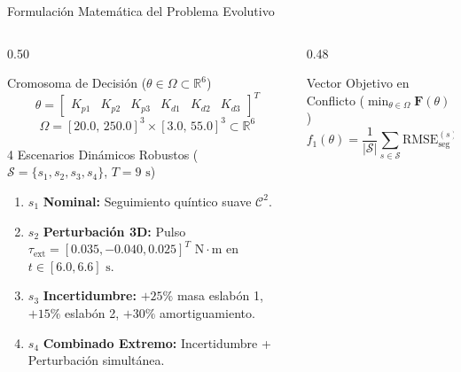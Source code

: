 \documentclass[aspectratio=169,9pt]{beamer}
\begin{document}
\begin{frame}{Formulación Matemática del Problema Evolutivo}
\vspace{-0.18cm}
\begin{columns}[T,onlytextwidth]
\begin{column}{0.50\textwidth}
    \begin{block}{\footnotesize Cromosoma de Decisión ($\theta \in \Omega \subset \mathbb{R}^6$)}
        \scriptsize
        \vspace{-0.18cm}
        \[
            \theta = \begin{bmatrix} K_{p1} & K_{p2} & K_{p3} & K_{d1} & K_{d2} & K_{d3} \end{bmatrix}^T
        \]
        \vspace{-0.22cm}
        \[
            \Omega = [20.0,\, 250.0]^3 \times [3.0,\, 55.0]^3 \subset \mathbb{R}^6
        \]
        \vspace{-0.2cm}
    \end{block}
    \vspace{-0.12cm}
    \begin{exampleblock}{\footnotesize 4 Escenarios Dinámicos Robustos ($\mathcal{S} = \{s_1,s_2,s_3,s_4\}$, $T=9\text{ s}$)}
        \scriptsize
        \begin{enumerate}\setlength{\itemsep}{1pt}
            \item $s_1$ \textbf{Nominal:} Seguimiento quíntico suave $\mathcal{C}^2$.
            \item $s_2$ \textbf{Perturbación 3D:} Pulso $\tau_{\text{ext}} = [0.035, -0.040, 0.025]^T\text{ N}\cdot\text{m}$ en $t \in [6.0, 6.6]\text{ s}$.
            \item $s_3$ \textbf{Incertidumbre:} $+25\%$ masa eslabón 1, $+15\%$ eslabón 2, $+30\%$ amortiguamiento.
            \item $s_4$ \textbf{Combinado Extremo:} Incertidumbre + Perturbación simultánea.
        \end{enumerate}
    \end{exampleblock}
\end{column}
\begin{column}{0.48\textwidth}
    \begin{block}{\footnotesize Vector Objetivo en Conflicto ($\min_{\theta \in \Omega} \mathbf{F}(\theta)$)}
        \scriptsize
        \vspace{-0.15cm}
        \[
            f_1(\theta) = \frac{1}{|\mathcal{S}|}\sum_{s \in \mathcal{S}} \text{RMSE}_{\text{seg}}^{(s)}(\theta) \quad [\text{mm}]
\]
\end{block}
\end{column}
\end{columns}
\end{frame}
\end{document}
